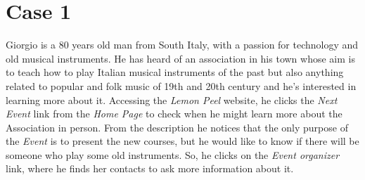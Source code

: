 \documentclass[../../DD.tex]{subfiles}
\begin{document}
\section{Case 1}

    Giorgio is a 80 years old man from South Italy, with a passion for technology and old musical instruments. He has heard of an association in his town whose aim is to teach how to play Italian musical instruments of the past but also anything related to popular and folk music of 19th and 20th century and he's interested in learning more about it.
	\newline Accessing the \textit{Lemon Peel} website, he clicks the \textit{Next Event} link from the \textit{Home Page} to check when he might learn more about the Association in person. From the description he notices that the only purpose of the \textit{Event} is to present the new courses, but he would like to know if there will be someone who play some old instruments. So, he clicks on the \textit{Event organizer} link, where he finds her contacts to ask more information about it.
	
\end{document}
